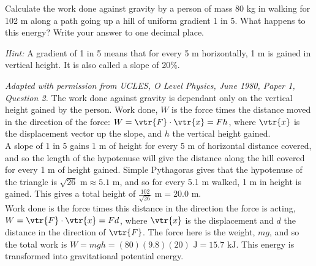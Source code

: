 
\begin{problem}[O1980PIQ2a]%
{Calculate the work done against gravity by a person of mass 80 kg in walking for 102 m along a path going up a hill of uniform gradient 1 in 5. What happens to this energy? Write your answer to one decimal place.

\emph{Hint:} A gradient of 1 in 5 means that for every 5 m horizontally, 1 m is gained in vertical height. It is also called a slope of 20\%.}
{\textit{Adapted with permission from UCLES, O Level Physics, June 1980, Paper 1, Question 2.}}
{The work done against gravity is dependant only on the vertical height gained by the person. Work done, $W$ is the force times the distance moved in the direction of the force: $W = \vtr{F}\cdot\vtr{x} = Fh$, where $\vtr{x}$ is the displacement vector up the slope, and $h$ the vertical height gained. \\

A slope of 1 in 5 gains 1 m of height for every 5 m of horizontal distance covered, and so the length of the hypotenuse will give the distance along the hill covered for every 1 m of height gained. Simple Pythagoras gives that the hypotenuse of the triangle is $\sqrt{26} \textrm{ m} \approx 5.1 \textrm{ m}$, and so for every 5.1 m walked, 1 m in height is gained. This gives a total height of $\frac{102}{\sqrt{26}} \textrm{ m} = 20.0 \textrm{ m}$.\\

Work done is the force times this distance in the direction the force is acting, $W = \vtr{F}\cdot\vtr{x} = Fd$, where $\vtr{x}$ is the displacement and $d$ the distance in the direction of $\vtr{F}$. The force here is the weight, $mg$, and so the total work is $W = mgh = (80)(9.8)(20) \textrm{ J} = 15.7 \textrm{ kJ}$. This energy is transformed into gravitational potential energy.
}
\end{problem}